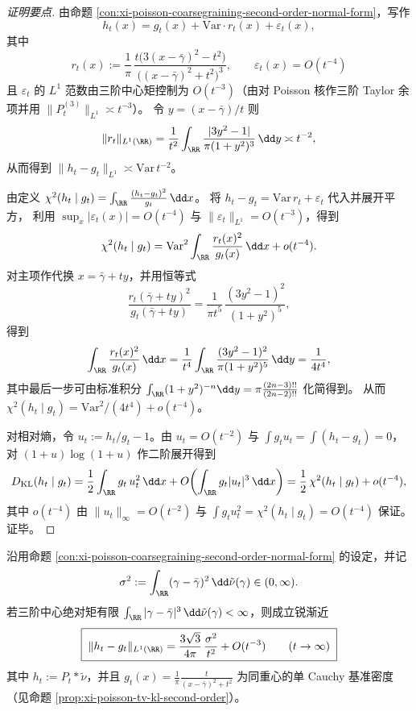\begin{proof}[证明要点]
由命题 \ref{con:xi-poisson-coarsegraining-second-order-normal-form}，写作
\[
h_t(x)=g_t(x)+\mathrm{Var}\cdot r_t(x)+\varepsilon_t(x),
\]
其中
\[
r_t(x):=\frac{1}{\pi}\,
\frac{t\bigl(3(x-\bar\gamma)^2-t^2\bigr)}{\bigl((x-\bar\gamma)^2+t^2\bigr)^3},
\qquad
\varepsilon_t(x)=O(t^{-4})
\]
且 \(\varepsilon_t\) 的 \(L^1\) 范数由三阶中心矩控制为 \(O(t^{-3})\)（由对 Poisson 核作三阶 Taylor 余项并用 \(\|P_t^{(3)}\|_{L^1}\asymp t^{-3}\)）。
令 \(y=(x-\bar\gamma)/t\) 则
\[
\|r_t\|_{L^1(\RR)}=\frac{1}{t^2}\int_{\RR}\frac{|3y^2-1|}{\pi(1+y^2)^3}\,\dd y
\asymp t^{-2},
\]
从而得到 \(\|h_t-g_t\|_{L^1}\asymp \mathrm{Var}\,t^{-2}\)。
\par
由定义
\(
\chi^2(h_t\mid g_t)=\int_{\RR}\frac{(h_t-g_t)^2}{g_t}\,\dd x
\)。
将 \(h_t-g_t=\mathrm{Var}\,r_t+\varepsilon_t\) 代入并展开平方，
利用 \(\sup_x|\varepsilon_t(x)|=O(t^{-4})\) 与 \(\|\varepsilon_t\|_{L^1}=O(t^{-3})\)，得到
\[
\chi^2(h_t\mid g_t)
=\mathrm{Var}^2\int_{\RR}\frac{r_t(x)^2}{g_t(x)}\,\dd x+o(t^{-4}).
\]
对主项作代换 \(x=\bar\gamma+ty\)，并用恒等式
\[
\frac{r_t(\bar\gamma+ty)^2}{g_t(\bar\gamma+ty)}=\frac{1}{\pi t^5}\,\frac{(3y^2-1)^2}{(1+y^2)^5},
\]
得到
\[
\int_{\RR}\frac{r_t(x)^2}{g_t(x)}\,\dd x
=\frac{1}{t^4}\int_{\RR}\frac{(3y^2-1)^2}{\pi(1+y^2)^5}\,\dd y
=\frac{1}{4t^4},
\]
其中最后一步可由标准积分
\(
\int_{\RR}(1+y^2)^{-n}\dd y=\pi\frac{(2n-3)!!}{(2n-2)!!}
\)
化简得到。
从而 \(\chi^2(h_t\mid g_t)=\mathrm{Var}^2/(4t^4)+o(t^{-4})\)。
\par
对相对熵，令 \(u_t:=h_t/g_t-1\)。由 \(u_t=O(t^{-2})\) 与 \(\int g_tu_t=\int(h_t-g_t)=0\)，
对 \((1+u)\log(1+u)\) 作二阶展开得到
\[
D_{\mathrm{KL}}(h_t\mid g_t)
=\frac12\int_{\RR} g_t\,u_t^2\,\dd x+O\!\left(\int_{\RR} g_t|u_t|^3\,\dd x\right)
=\frac12\,\chi^2(h_t\mid g_t)+o(t^{-4}),
\]
其中 \(o(t^{-4})\) 由 \(\|u_t\|_\infty=O(t^{-2})\) 与 \(\int g_tu_t^2=\chi^2(h_t\mid g_t)=O(t^{-4})\) 保证。
证毕。
\end{proof}


\begin{theorem}\label{thm:xi-cauchy-poisson-tv-sharp-constant}
沿用命题 \ref{con:xi-poisson-coarsegraining-second-order-normal-form} 的设定，并记
\[
\sigma^2:=\int_{\RR}(\gamma-\bar\gamma)^2\,\dd\tilde\nu(\gamma)\in(0,\infty).
\]
若三阶中心绝对矩有限
\(
\int_{\RR}|\gamma-\bar\gamma|^3\,\dd\tilde\nu(\gamma)<\infty
\)，则成立锐渐近
\begin{equation}\label{eq:xi-cauchy-poisson-tv-sharp-constant}
\boxed{\;
\|h_t-g_t\|_{L^1(\RR)}
=\frac{3\sqrt3}{4\pi}\,\frac{\sigma^2}{t^2}+O(t^{-3})
\qquad(t\to\infty)\;}
\end{equation}
其中 \(h_t:=P_t*\tilde\nu\)，并且 \(g_t(x)=\frac{1}{\pi}\frac{t}{(x-\bar\gamma)^2+t^2}\) 为同重心的单 Cauchy 基准密度（见命题 \ref{prop:xi-poisson-tv-kl-second-order}）。
\end{theorem}

